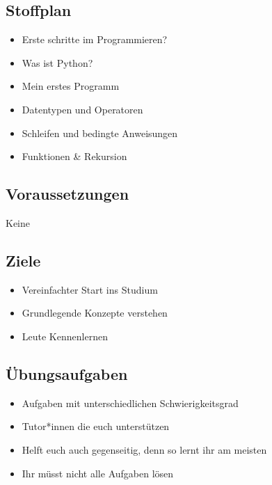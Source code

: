 \subsection{Stoffplan}
\begin{frame}
	\slidehead
	\begin{itemize}
		\item Erste schritte im Programmieren?
		\item Was ist Python?
		\item Mein erstes Programm
		\item Datentypen und Operatoren
		\item Schleifen und bedingte Anweisungen
		\item Funktionen \& Rekursion
	\end{itemize}
\end{frame}

\subsection{Voraussetzungen}
\begin{frame}
	\slidehead
	\centering
	\vspace{1.5cm}
	\Huge Keine
\end{frame}

\subsection{Ziele}
\begin{frame}
	\slidehead
	\begin{itemize}
		\item Vereinfachter Start ins Studium
		\item Grundlegende Konzepte verstehen
		\item Leute Kennenlernen

	\end{itemize}
\end{frame}

\subsection{Übungsaufgaben}
\begin{frame}
	\slidehead
	\begin{itemize}
		\item Aufgaben mit unterschiedlichen Schwierigkeitsgrad
		\item Tutor*innen
		die euch unterstützen
		\item Helft euch auch gegenseitig, denn so lernt ihr am meisten
		\item Ihr müsst nicht alle Aufgaben lösen
	\end{itemize}
\end{frame}

